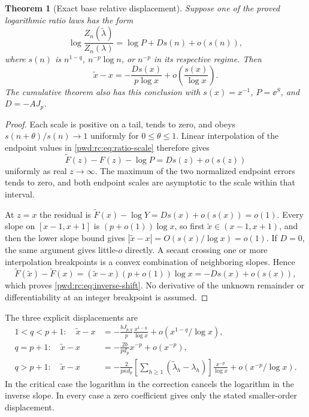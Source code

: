 \documentclass[11pt,letterpaper]{article}
\numberwithin{equation}{section}
\newtheorem{theorem}{Theorem}[section]
\theoremstyle{remark}\newtheorem{remark}[theorem]{Remark}
\begin{document}
\begin{theorem}[Exact base relative displacement]\label{pwd:rc:thm:inverse}
Suppose one of the proved logarithmic ratio laws has the form
\begin{equation}\label{pwd:rc:eq:ratio-scale}
 \log\frac{Z_n(\widetilde\lambda)}{Z_n(\lambda)}
 =\log P+D s(n)+o(s(n)),
\end{equation}
where $s(n)$ is $n^{1-q}$, $n^{-p}\log n$, or $n^{-p}$ in its respective regime. Then
\begin{equation}\label{pwd:rc:eq:inverse-shift}
 \widetilde x-x=-\frac{D s(x)}{p\log x}
 +o\left(\frac{s(x)}{\log x}\right).
\end{equation}
The cumulative theorem also has this conclusion with $s(x)=x^{-1}$, $P=\ee^S$, and $D=-AJ_p$.
\end{theorem}
\begin{proof}
Each scale is positive on a tail, tends to zero, and obeys $s(n+\theta)/s(n)\to1$ uniformly for $0\le\theta\le1$. Linear interpolation of the endpoint values in \eqref{pwd:rc:eq:ratio-scale} therefore gives
\[
 \widetilde F(z)-F(z)-\log P=D s(z)+o(s(z))
\]
uniformly as real $z\to\infty$. The maximum of the two normalized endpoint errors tends to zero, and both endpoint scales are asymptotic to the scale within that interval.

At $z=x$ the residual is $\widetilde F(x)-\log Y=D s(x)+o(s(x))=o(1)$. Every slope on $[x-1,x+1]$ is $(p+o(1))\log x$, so first $\widetilde x\in(x-1,x+1)$, and then the lower slope bound gives $|\widetilde x-x|=O(s(x)/\log x)=o(1)$. If $D=0$, the same argument gives little-$o$ directly. A secant crossing one or more interpolation breakpoints is a convex combination of neighboring slopes. Hence
\[
 \widetilde F(\widetilde x)-\widetilde F(x)
 =(\widetilde x-x)(p+o(1))\log x
 =-D s(x)+o(s(x)),
\]
which proves \eqref{pwd:rc:eq:inverse-shift}. No derivative of the unknown remainder or differentiability at an integer breakpoint is assumed.
\end{proof}
The three explicit displacements are
\begin{align*}
 1<q<p+1:\quad
 \widetilde x-x&=-\frac{bJ_{p,q}}p\frac{x^{1-q}}{\log x}
 +o(x^{1-q}/\log x),\\
 q=p+1:\quad
 \widetilde x-x&=-\frac{2b}{p d_p}x^{-p}+o(x^{-p}),\\
 q>p+1:\quad
 \widetilde x-x&=-\frac2{p\kappa d_p}
 \left[\sum_{h\ge1}(\widetilde\lambda_h-\lambda_h)\right]
 \frac{x^{-p}}{\log x}+o(x^{-p}/\log x).
\end{align*}
In the critical case the logarithm in the correction cancels the logarithm in the inverse slope. In every case a zero coefficient gives only the stated smaller-order displacement.
\end{document}
